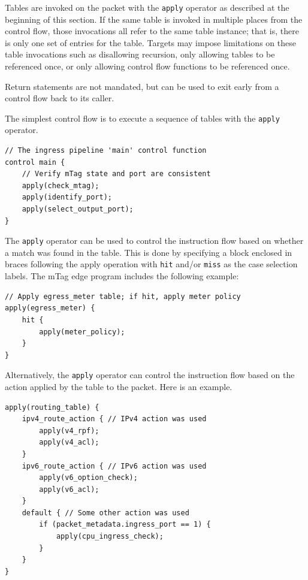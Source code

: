 \documentclass[12pt]{article}
\begin{document}
Tables are invoked on the packet with the \texttt{apply} operator as described at 
the beginning of this section. If the same table is invoked in multiple places 
from the control flow, those invocations all refer to the same table instance; 
that is, there is only one set of \matchaction  entries for the table. Targets
may impose limitations on these table invocations such as disallowing recursion,
only allowing tables to be referenced once, or only allowing control flow
functions to be referenced once.

Return statements are not mandated, but can be used to exit early from a control
flow back to its caller.

The simplest control flow is to execute a sequence of tables with the \texttt{apply} operator.

\begin{lstlisting}[style=P4style]
// The ingress pipeline 'main' control function
control main {
    // Verify mTag state and port are consistent
    apply(check_mtag);
    apply(identify_port);
    apply(select_output_port);
}
\end{lstlisting}


The \texttt{apply} operator can be used to control the instruction flow based on whether 
a match was found in the table. This is done by specifying a block enclosed 
in braces following the apply operation with \texttt{hit} and/or \texttt{miss} as the case 
selection labels.  The mTag edge program includes the following example:

\begin{lstlisting}[style=P4style]
// Apply egress_meter table; if hit, apply meter policy
apply(egress_meter) {
    hit {
        apply(meter_policy);
    }
}
\end{lstlisting}


Alternatively, the \texttt{apply} operator can control the instruction flow based 
on the action applied by the table to the packet. Here is an example.

\begin{lstlisting}[style=P4style]
apply(routing_table) {
    ipv4_route_action { // IPv4 action was used
        apply(v4_rpf);
        apply(v4_acl);
    }
    ipv6_route_action { // IPv6 action was used
        apply(v6_option_check);
        apply(v6_acl);
    }
    default { // Some other action was used
        if (packet_metadata.ingress_port == 1) {
            apply(cpu_ingress_check);
        }
    }
}
\end{lstlisting}
\end{document}
